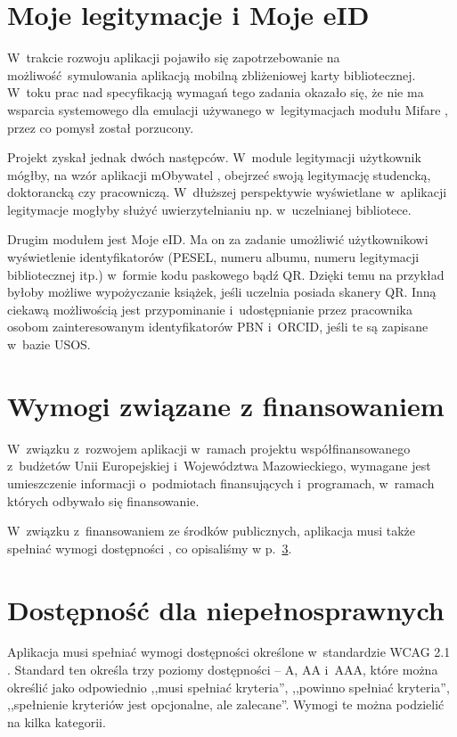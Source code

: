 \documentclass{pracamgr}
\begin{document}
\section{Moje legitymacje i Moje eID}

W~trakcie rozwoju aplikacji pojawiło się zapotrzebowanie na możliwość symulowania
aplikacją mobilną zbliżeniowej karty bibliotecznej. W~toku prac nad specyfikacją wymagań
tego zadania okazało się, że nie ma wsparcia systemowego dla emulacji używanego w~legitymacjach
modułu Mifare \cite{mifare}, przez co pomysł został porzucony.

Projekt zyskał jednak dwóch następców. W~module legitymacji użytkownik mógłby, na wzór
aplikacji mObywatel \cite{mobywatel}, obejrzeć swoją legitymację studencką, doktorancką czy
pracowniczą. W~dłuższej perspektywie wyświetlane w~aplikacji legitymacje mogłyby służyć
uwierzytelnianiu np. w~uczelnianej bibliotece.

Drugim modułem jest Moje eID. Ma on za zadanie umożliwić użytkownikowi
wyświetlenie identyfikatorów (PESEL, numeru albumu, numeru legitymacji bibliotecznej itp.)
w~formie kodu paskowego bądź QR. Dzięki temu na przykład byłoby możliwe
wypożyczanie książek, jeśli uczelnia posiada skanery QR. Inną ciekawą możliwością jest
przypominanie i~udostępnianie przez pracownika osobom zainteresowanym identyfikatorów
PBN i~ORCID, jeśli te są zapisane w~bazie USOS.

\section{Wymogi związane z finansowaniem}

W~związku z~rozwojem aplikacji w~ramach projektu współfinansowanego z~budżetów Unii
Europejskiej i~Województwa Mazowieckiego, wymagane jest umieszczenie informacji
o~podmiotach finansujących i~programach, w~ramach których odbywało się finansowanie.

W~związku z~finansowaniem ze środków publicznych, aplikacja musi także spełniać wymogi
dostępności \cite{uodc}, co opisaliśmy w p.~\ref{sec:dostepnosc}.

\section{Dostępność dla niepełnosprawnych}
\label{sec:dostepnosc}

Aplikacja musi spełniać wymogi dostępności określone w~standardzie WCAG 2.1 \cite{wcag21}.
Standard ten określa trzy poziomy dostępności -- A, AA i~AAA, które można określić jako
odpowiednio ,,musi spełniać kryteria'', ,,powinno spełniać kryteria'',
,,spełnienie kryteriów jest opcjonalne, ale zalecane''.
Wymogi te można podzielić na kilka kategorii.
\end{document}
